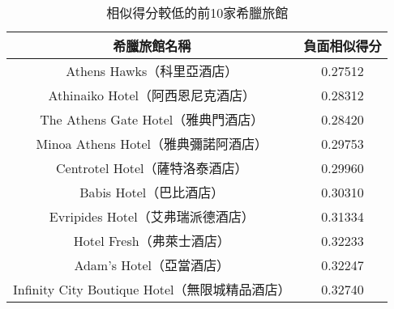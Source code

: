 		\begin{table}[H]
	\centering
	\caption{相似得分較低的前10家希臘旅館}
	\begin{tabular}{|c|c|}
	\toprule
	希臘旅館名稱 & 負面相似得分 \\
	\midrule
	Athens Hawks（科里亞酒店） & 0.27512  \\
	\midrule
	Athinaiko Hotel（阿西恩尼克酒店） & 0.28312 \\
	\midrule
	The Athens Gate Hotel（雅典門酒店） & 0.28420 \\
	\midrule
	Minoa Athens Hotel（雅典彌諾阿酒店） & 0.29753 \\
	\midrule
	Centrotel Hotel（薩特洛泰酒店） & 0.29960 \\
	\midrule
	Babis Hotel（巴比酒店） &  0.30310 \\
	\midrule
	Evripides Hotel（艾弗瑞派德酒店） & 0.31334 \\
	\midrule
	Hotel Fresh（弗萊士酒店） & 0.32233 \\
	\midrule
	Adam's Hotel（亞當酒店） & 0.32247 \\
	\midrule
	Infinity City Boutique Hotel（無限城精品酒店） & 0.32740 \\
	\bottomrule
	\end{tabular}
	\label{tab12}
	\end{table}

%










